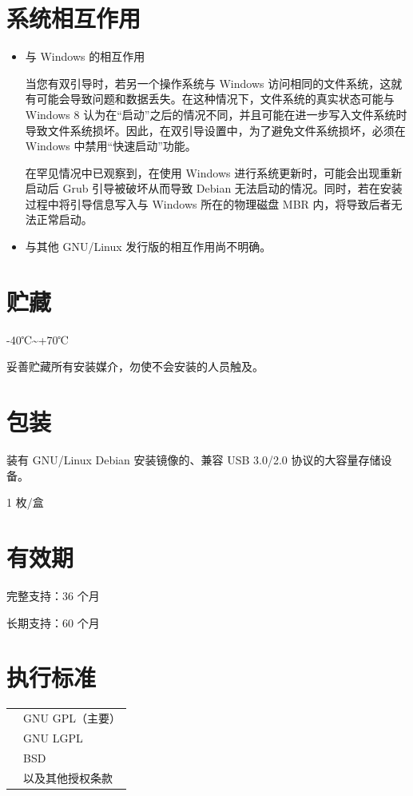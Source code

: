 \documentclass{article}
\begin{document}
\begin{multicols*}{3}
	\section*{系统相互作用}
	\begin{itemize}[leftmargin=*]
		\setlength{\parindent}{0pt}

		\item 与 Windows 的相互作用
		
		当您有双引导时，若另一个操作系统与 Windows 访问相同的文件系统，这就有可能会导致问题和数据丢失。在这种情况下，文件系统的真实状态可能与 Windows 8 认为在“启动”之后的情况不同，并且可能在进一步写入文件系统时导致文件系统损坏。因此，在双引导设置中，为了避免文件系统损坏，必须在 Windows 中禁用“快速启动”功能。
		
		在罕见情况中已观察到，在使用 Windows 进行系统更新时，可能会出现重新启动后 Grub 引导被破坏从而导致 Debian 无法启动的情况。同时，若在安装过程中将引导信息写入与 Windows 所在的物理磁盘 MBR 内，将导致后者无法正常启动。

		\item 与其他 GNU/Linux 发行版的相互作用尚不明确。

	\end{itemize}


	\section*{贮藏}

	-40℃\textasciitilde +70℃

	妥善贮藏所有安装媒介，勿使不会安装的人员触及。


	\section*{包装}

	装有 GNU/Linux Debian 安装镜像的、兼容 USB 3.0/2.0 协议的大容量存储设备。
	
	1 枚/盒


	\section*{有效期}

	完整支持：36 个月

	长期支持：60 个月


	\section*{执行标准}
	\begin{tabularx}{\linewidth}{@{}ll@{}}
		\multirow{4}{*}{}{开源许可证：} & GNU GPL（主要）\\
		~ & GNU LGPL \\
		~ & BSD \\
		~ & 以及其他授权条款 \\
	\end{tabularx}



\end{multicols*}
\end{document}
